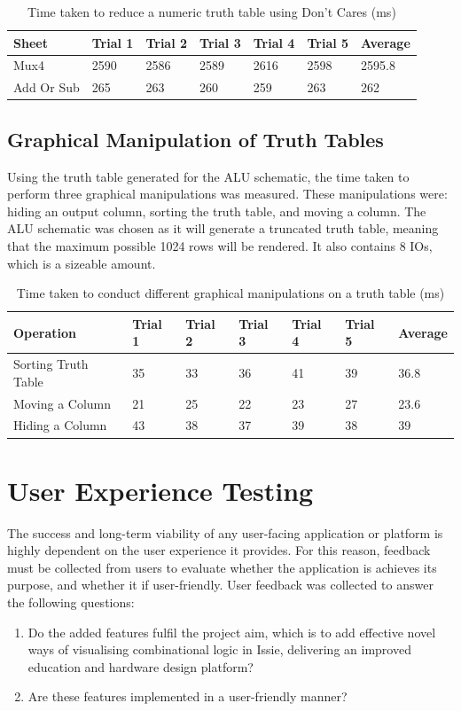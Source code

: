 \begin{table}[!ht]
    \centering
    \begin{tabular}{|l|l|l|l|l|l|l|}
    \hline
        Sheet & Trial 1 & Trial 2 & Trial 3 & Trial 4 & Trial 5 & Average \\ \hline
        Mux4 & 2590 & 2586 & 2589 & 2616 & 2598 & 2595.8 \\ \hline
        Add Or Sub & 265 & 263 & 260 & 259 & 263 & 262 \\ \hline
    \end{tabular}
    \caption{Time taken to reduce a numeric truth table using Don't Cares (ms)}
    \label{tab:timeDCTT}
\end{table}

\subsection{Graphical Manipulation of Truth Tables}
Using the truth table generated for the ALU schematic, the time taken to perform three graphical manipulations was measured. These manipulations were: hiding an output column, sorting the truth table, and moving a column. The ALU schematic was chosen as it will generate a truncated truth table, meaning that the maximum possible 1024 rows will be rendered. It also contains 8 IOs, which is a sizeable amount.

\begin{table}[!ht]
    \centering
    \begin{tabular}{|l|l|l|l|l|l|l|}
    \hline
        Operation & Trial 1 & Trial 2 & Trial 3 & Trial 4 & Trial 5 & Average \\ \hline
        Sorting Truth Table & 35 & 33 & 36 & 41 & 39 & 36.8 \\ \hline
        Moving a Column & 21 & 25 & 22 & 23 & 27 & 23.6 \\ \hline
        Hiding a Column & 43 & 38 & 37 & 39 & 38 & 39 \\ \hline
    \end{tabular}
    \caption{Time taken to conduct different graphical manipulations on a truth table (ms)}
    \label{tab:timeTTManip}
\end{table}

\section{User Experience Testing} \label{sec:uxtest}
The success and long-term viability of any user-facing application or platform is highly dependent on the user experience it provides. For this reason, feedback must be collected from users to evaluate whether the application is achieves its purpose, and whether it if user-friendly. User feedback was collected to answer the following questions:
\begin{enumerate}
    \item Do the added features fulfil the project aim, which is to add effective novel ways of visualising combinational logic in Issie, delivering an improved education and hardware design platform?
    \item Are these features implemented in a user-friendly manner?
\end{enumerate}

